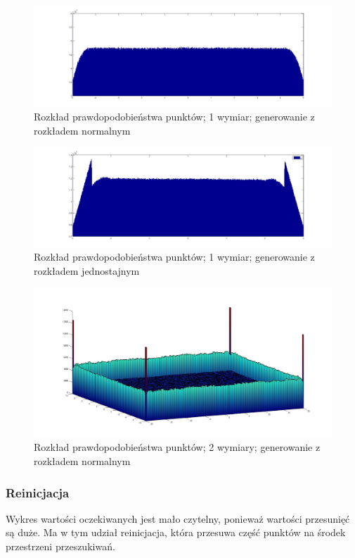 \documentclass{mini}
\begin{document}
\begin{figure}[H]
\centering
\includegraphics[width=\textwidth]{p_n_50M_1__5_5}
\caption{Rozkład prawdopodobieństwa punktów; 1 wymiar; generowanie z rozkładem normalnym}
\label{bladzenie:rzutowanie1dn}
\end{figure}

\begin{figure}[H]
\centering
\includegraphics[width=\textwidth]{p_j_100M_1__3_3}
\caption{Rozkład prawdopodobieństwa punktów; 1 wymiar; generowanie z rozkładem jednostajnym}
\label{bladzenie:rzutowanie1dj}
\end{figure}

\begin{figure}[H]
\centering
\includegraphics[width=\textwidth]{p_n_10M_2__20_20__10_10_4_2}
\caption{Rozkład prawdopodobieństwa punktów; 2 wymiary; generowanie z rozkładem normalnym}
\label{bladzenie:rzutowanie2d}
\end{figure}

\subsubsection*{Reinicjacja}
Wykres wartości oczekiwanych jest mało czytelny, ponieważ wartości przesunięć są duże. Ma w tym udział reinicjacja, która przesuwa część punktów na środek przestrzeni przeszukiwań.
\end{document}
